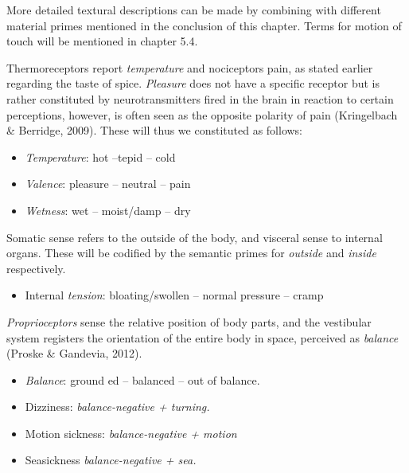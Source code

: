 More detailed textural descriptions can be made by combining with different material primes mentioned in the conclusion of this chapter. Terms for motion of touch will be mentioned in chapter 5.4.  

Thermoreceptors report \textit{temperature} and nociceptors pain, as stated earlier regarding the taste of spice. \textit{Pleasure} does not have a specific receptor but is rather constituted by neurotransmitters fired in the brain in reaction to certain perceptions, however, is often seen as the opposite polarity of pain (Kringelbach \& Berridge, 2009). These will thus we constituted as follows:  


\begin{itemize}
\item   \textit{Temperature}: hot –tepid – cold  

\item   \textit{Valence}: pleasure – neutral – pain  

\item   \textit{Wetness}: wet – moist/damp – dry 
\end{itemize}

Somatic sense refers to the outside of the body, and visceral sense to internal organs. These will be codified by the semantic primes for \textit{outside} and \textit{inside} respectively.   

\begin{itemize}
	\item Internal \textit{tension}: bloating/swollen – normal pressure – cramp  
\end{itemize}

{\it Proprioceptors} sense the relative position of body parts, and the vestibular system registers the orientation of the entire body in space, perceived as \textit{balance} (Proske \& Gandevia, 2012).  

\begin{itemize}
	\item \textit{Balance}: ground ed – balanced – out of balance.  

	\item Dizziness: \textit{balance-negative + turning.} 

	\item Motion sickness:  \textit{ balance-negative + motion } 

	\item Seasickness \textit{balance-negative + sea.} 
\end{itemize}


